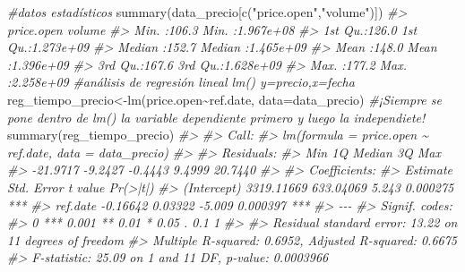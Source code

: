 \documentclass[
]{book}
\newenvironment{Shaded}{\begin{snugshade}}{\end{snugshade}}
\newcommand{\AttributeTok}[1]{\textcolor[rgb]{0.77,0.63,0.00}{#1}}
\newcommand{\CommentTok}[1]{\textcolor[rgb]{0.56,0.35,0.01}{\textit{#1}}}
\newcommand{\FunctionTok}[1]{\textcolor[rgb]{0.00,0.00,0.00}{#1}}
\newcommand{\NormalTok}[1]{#1}
\newcommand{\OtherTok}[1]{\textcolor[rgb]{0.56,0.35,0.01}{#1}}
\newcommand{\SpecialCharTok}[1]{\textcolor[rgb]{0.00,0.00,0.00}{#1}}
\newcommand{\StringTok}[1]{\textcolor[rgb]{0.31,0.60,0.02}{#1}}
\begin{document}
\begin{Shaded}
\begin{Highlighting}[]
\CommentTok{\#datos estadísticos}
\FunctionTok{summary}\NormalTok{(data\_precio[}\FunctionTok{c}\NormalTok{(}\StringTok{"price.open"}\NormalTok{,}\StringTok{"volume"}\NormalTok{)])}
\CommentTok{\#\textgreater{}    price.open        volume         }
\CommentTok{\#\textgreater{}  Min.   :106.3   Min.   :1.967e+08  }
\CommentTok{\#\textgreater{}  1st Qu.:126.0   1st Qu.:1.273e+09  }
\CommentTok{\#\textgreater{}  Median :152.7   Median :1.465e+09  }
\CommentTok{\#\textgreater{}  Mean   :148.0   Mean   :1.396e+09  }
\CommentTok{\#\textgreater{}  3rd Qu.:167.6   3rd Qu.:1.628e+09  }
\CommentTok{\#\textgreater{}  Max.   :177.2   Max.   :2.258e+09}
\CommentTok{\#análisis de regresión lineal lm() y=precio,x=fecha}
\NormalTok{reg\_tiempo\_precio}\OtherTok{\textless{}{-}}\FunctionTok{lm}\NormalTok{(price.open}\SpecialCharTok{\textasciitilde{}}\NormalTok{ref.date, }\AttributeTok{data=}\NormalTok{data\_precio) }
\CommentTok{\#¡Siempre se pone dentro de lm() la variable dependiente primero y luego la independiete!}
\FunctionTok{summary}\NormalTok{(reg\_tiempo\_precio)}
\CommentTok{\#\textgreater{} }
\CommentTok{\#\textgreater{} Call:}
\CommentTok{\#\textgreater{} lm(formula = price.open \textasciitilde{} ref.date, data = data\_precio)}
\CommentTok{\#\textgreater{} }
\CommentTok{\#\textgreater{} Residuals:}
\CommentTok{\#\textgreater{}      Min       1Q   Median       3Q      Max }
\CommentTok{\#\textgreater{} {-}21.9717  {-}9.2427  {-}0.4443   9.4999  20.7440 }
\CommentTok{\#\textgreater{} }
\CommentTok{\#\textgreater{} Coefficients:}
\CommentTok{\#\textgreater{}               Estimate Std. Error t value Pr(\textgreater{}|t|)    }
\CommentTok{\#\textgreater{} (Intercept) 3319.11669  633.04069   5.243 0.000275 ***}
\CommentTok{\#\textgreater{} ref.date      {-}0.16642    0.03322  {-}5.009 0.000397 ***}
\CommentTok{\#\textgreater{} {-}{-}{-}}
\CommentTok{\#\textgreater{} Signif. codes:  }
\CommentTok{\#\textgreater{} 0 \textquotesingle{}***\textquotesingle{} 0.001 \textquotesingle{}**\textquotesingle{} 0.01 \textquotesingle{}*\textquotesingle{} 0.05 \textquotesingle{}.\textquotesingle{} 0.1 \textquotesingle{} \textquotesingle{} 1}
\CommentTok{\#\textgreater{} }
\CommentTok{\#\textgreater{} Residual standard error: 13.22 on 11 degrees of freedom}
\CommentTok{\#\textgreater{} Multiple R{-}squared:  0.6952, Adjusted R{-}squared:  0.6675 }
\CommentTok{\#\textgreater{} F{-}statistic: 25.09 on 1 and 11 DF,  p{-}value: 0.0003966}


\end{Highlighting}
\end{Shaded}
\end{document}
